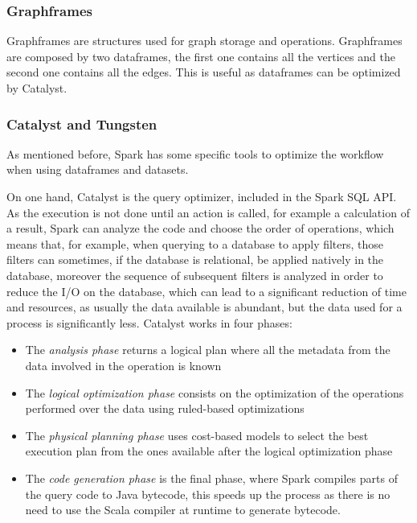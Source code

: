 \documentclass[11pt]{article} %
\begin{document}
      \subsubsection*{Graphframes}

        Graphframes are structures used for graph storage and operations. Graphframes are composed by two dataframes, the first one contains all the vertices and the second one contains all the edges. This is useful as dataframes can be optimized by Catalyst.

      \subsubsection*{Catalyst and Tungsten}

        As mentioned before, Spark has some specific tools to optimize the workflow when using dataframes and datasets.

        On one hand, Catalyst is the query optimizer, included in the Spark SQL API. As the execution is not done until an action is called, for example a calculation of a result, Spark can analyze the code and choose the order of operations, which means that, for example, when querying to a database to apply filters, those filters can sometimes, if the database is relational, be applied natively in the database, moreover the sequence of subsequent filters is analyzed in order to reduce the I/O on the database, which can lead to a significant reduction of time and resources, as usually the data available is abundant, but the data used for a process is significantly less. Catalyst works in four phases:

        \begin{itemize}
          \item The \emph{analysis phase} returns a logical plan where all the metadata from the data involved in the operation is known
          \item The \emph{logical optimization phase} consists on the optimization of the operations performed over the data using ruled-based optimizations
          \item The \emph{physical planning phase} uses cost-based models to select the best execution plan from the ones available after the logical optimization phase
          \item The \emph{code generation phase} is the final phase, where Spark compiles parts of the query code to Java bytecode, this speeds up the process as there is no need to use the Scala compiler at runtime to generate bytecode.
        \end{itemize}
\end{document}
